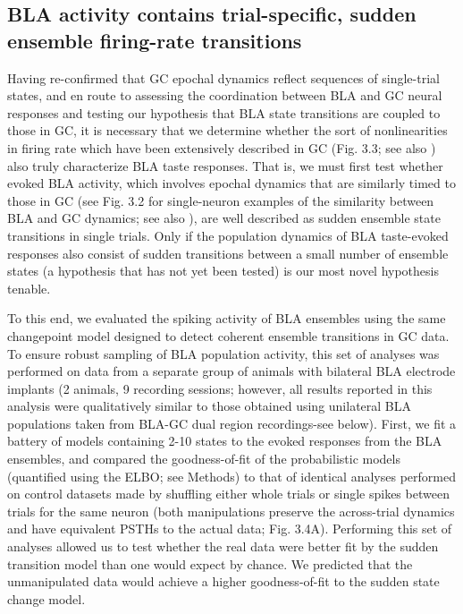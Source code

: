 \begin{refsection}
\subsection{BLA activity contains trial-specific, sudden ensemble firing-rate transitions}
Having re-confirmed that GC epochal dynamics reflect sequences of single-trial states, and en route to assessing the coordination between BLA and GC neural responses and testing our hypothesis that BLA state transitions are coupled to those in GC, it is necessary that we determine whether the sort of nonlinearities in firing rate which have been extensively described in GC (Fig. 3.3; see also \cite{jones2007a,sadacca2016a}) also truly characterize BLA taste responses. That is, we must first test whether evoked BLA activity, which involves epochal dynamics that are similarly timed to those in GC (see Fig. 3.2 for single-neuron examples of the similarity between BLA and GC dynamics; see also \cite{fontanini2009a}), are well described as sudden ensemble state transitions in single trials. Only if the population dynamics of BLA taste-evoked responses also consist of sudden transitions between a small number of ensemble states (a hypothesis that has not yet been tested) is our most novel hypothesis tenable.

To this end, we evaluated the spiking activity of BLA ensembles using the same changepoint model designed to detect coherent ensemble transitions in GC data. To ensure robust sampling of BLA population activity, this set of analyses was performed on data from a separate group of animals with bilateral BLA electrode implants (2 animals, 9 recording sessions; however, all results reported in this analysis were qualitatively similar to those obtained using unilateral BLA populations taken from BLA-GC dual region recordings-see below). First, we fit a battery of models containing 2-10 states to the evoked responses from the BLA ensembles, and compared the goodness-of-fit of the probabilistic models (quantified using the ELBO; see Methods) to that of identical analyses performed on control datasets made by shuffling either whole trials or single spikes between trials for the same neuron (both manipulations preserve the across-trial dynamics and have equivalent PSTHs to the actual data; Fig. 3.4A). Performing this set of analyses allowed us to test whether the real data were better fit by the sudden transition model than one would expect by chance. We predicted that the unmanipulated data would achieve a higher goodness-of-fit to the sudden state change model.


\end{refsection}

